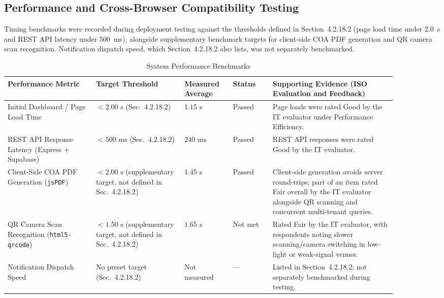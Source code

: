 \subsection{Performance and Cross-Browser Compatibility Testing}
\label{subsec:performance_and_cross_browser_compatibility_testing}

\hspace*{\parindent}Timing benchmarks were recorded during deployment testing against the thresholds defined in Section~4.2.18.2 (page load time under 2.0~s and REST API latency under 500~ms), alongside supplementary benchmark targets for client-side COA PDF generation and QR camera scan recognition. Notification dispatch speed, which Section~4.2.18.2 also lists, was not separately benchmarked.
\vspace{5mm}

\begin{table}[H]
\centering
\footnotesize
\setlength{\tabcolsep}{4pt}
\caption{System Performance Benchmarks}
\label{tab:system_performance_benchmarks}
\begin{tabular}{|>{\raggedright\arraybackslash}p{0.20\linewidth}|>{\raggedright\arraybackslash}p{0.20\linewidth}|>{\centering\arraybackslash}p{0.11\linewidth}|>{\centering\arraybackslash}p{0.09\linewidth}|>{\raggedright\arraybackslash}p{0.29\linewidth}|}
\hline
\textbf{Performance Metric} & \textbf{Target Threshold} & \textbf{Measured Average} & \textbf{Status} & \textbf{Supporting Evidence (ISO Evaluation and Feedback)} \\ \hline
Initial Dashboard / Page Load Time & $< 2.00\text{ s}$ (Sec.~4.2.18.2) & $1.15\text{ s}$ & Passed & Page loads were rated Good by the IT evaluator under Performance Efficiency. \\ \hline
REST API Response Latency (Express + Supabase) & $< 500\text{ ms}$ (Sec.~4.2.18.2) & $240\text{ ms}$ & Passed & REST API responses were rated Good by the IT evaluator. \\ \hline
Client-Side COA PDF Generation (\texttt{jsPDF}) & $< 2.00\text{ s}$ (supplementary target, not defined in Sec.~4.2.18.2) & $1.45\text{ s}$ & Passed & Client-side generation avoids server round-trips; part of an item rated Fair overall by the IT evaluator alongside QR scanning and concurrent multi-tenant queries. \\ \hline
QR Camera Scan Recognition (\texttt{html5-qrcode}) & $< 1.50\text{ s}$ (supplementary target, not defined in Sec.~4.2.18.2) & $1.65\text{ s}$ & Not met & Rated Fair by the IT evaluator, with respondents noting slower scanning/camera switching in low-light or weak-signal venues. \\ \hline
Notification Dispatch Speed & No preset target (Sec.~4.2.18.2) & Not measured & --- & Listed in Section~4.2.18.2; not separately benchmarked during testing. \\ \hline
\end{tabular}
\end{table}
\vspace{5mm}


